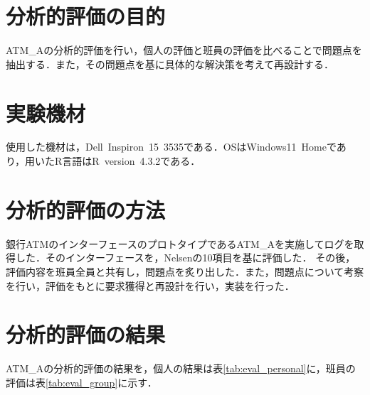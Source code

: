 \documentclass{jlreq}
\numberwithin{equation}{section}
\begin{document}
\tableofcontents
\clearpage

\section{分析的評価の目的}
ATM\_Aの分析的評価を行い，個人の評価と班員の評価を比べることで問題点を抽出する．また，その問題点を基に具体的な解決策を考えて再設計する．

\section{実験機材}
使用した機材は，Dell\ Inspiron\ 15\ 3535である．OSはWindows11\ Homeであり，用いたR言語はR\ version\ 4.3.2である．

\section{分析的評価の方法}
銀行ATMのインターフェースのプロトタイプであるATM\_Aを実施してログを取得した．そのインターフェースを，Nelsenの10項目を基に評価した．
その後，評価内容を班員全員と共有し，問題点を炙り出した．また，問題点について考察を行い，評価をもとに要求獲得と再設計を行い，実装を行った．

\section{分析的評価の結果}
ATM\_Aの分析的評価の結果を，個人の結果は表\ref{tab:eval_personal}に，班員の評価は表\ref{tab:eval_group}に示す．
\end{document}
